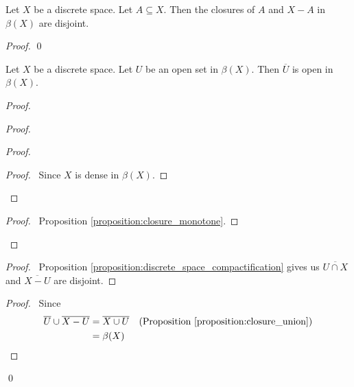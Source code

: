 \begin{proposition}
    \label{proposition:discrete_space_compactification}
    Let $X$ be a discrete space. Let $A \subseteq X$. Then the closures of $A$ and $X - A$ in $\beta(X)$ are disjoint.
\end{proposition}

\begin{proof}
    \pf
    \qed
\end{proof}

\begin{proposition}
    \label{proposition:discrete_open_closure_compactification}
    Let $X$ be a discrete space. Let $U$ be an open set in $\beta(X)$. Then $\overline{U}$ is open in $\beta(X)$.
\end{proposition}

\begin{proof}
    \pf
    \begin{proof}
        \begin{proof}
            \begin{proof}
                \pf\ Since $X$ is dense in $\beta(X)$.
            \end{proof}
        \end{proof}
        \begin{proof}
            \pf\ Proposition \ref{proposition:closure_monotone}.
        \end{proof}
    \end{proof}
    \begin{proof}
        \pf\ Proposition \ref{proposition:discrete_space_compactification} gives us $\overline{U \cap X}$
        and $\overline{X - U}$ are disjoint.
    \end{proof}
    \begin{proof}
        \pf\ Since
        \begin{align*}
            \overline{U} \cup \overline{X - U} & = \overline{X \cup U} & (\text{Proposition \ref{proposition:closure_union}}) \\
            & = \beta(X)
        \end{align*}
    \end{proof}
    \qed
\end{proof}

